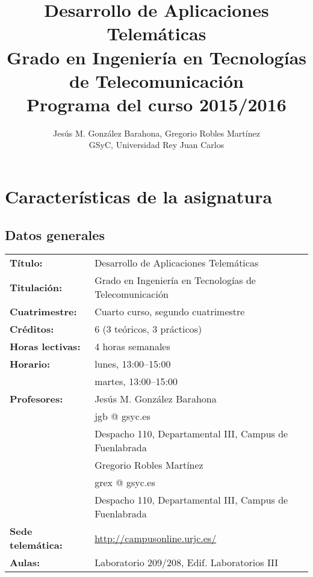 \documentclass[a4paper,12pt]{report}
\title{Desarrollo de Aplicaciones Telemáticas \\
Grado en Ingeniería en Tecnologías de Telecomunicación \\
Programa del curso 2015/2016}
\author{Jesús M. González Barahona, Gregorio Robles Martínez \\
GSyC, Universidad Rey Juan Carlos}
\begin{document}
\maketitle

\tableofcontents

\newpage

\chapter{Características de la asignatura}

\section{Datos generales}

\begin{tabular}{ll}
\textbf{Título:} & Desarrollo de Aplicaciones Telemáticas  \\
\textbf{Titulación:} & Grado en Ingeniería en Tecnologías de Telecomunicación \\
\textbf{Cuatrimestre:} & Cuarto curso, segundo cuatrimestre \\
\textbf{Créditos:} & 6 (3 teóricos, 3 prácticos) \\
\textbf{Horas lectivas:} & 4 horas semanales \\
\textbf{Horario:} & lunes, 13:00--15:00 \\
                  & martes, 13:00--15:00 \\
\textbf{Profesores:}
& Jesús M. González Barahona \\
& \hspace{1cm}jgb @ gsyc.es \\
& \hspace{1cm}Despacho 110, Departamental III, Campus de Fuenlabrada\\
& Gregorio Robles Martínez\\
& \hspace{1cm}grex @ gsyc.es \\
& \hspace{1cm}Despacho 110, Departamental III, Campus de Fuenlabrada\\
\textbf{Sede telemática:} & \url{http://campusonline.urjc.es/} \\
\textbf{Aulas:} & Laboratorio 209/208, Edif. Laboratorios III \\
\end{tabular}
\end{document}
